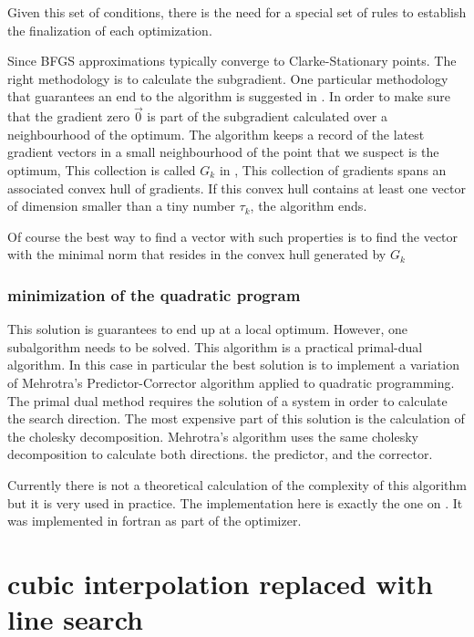 Given this set of conditions, there is the need for a special set of rules to establish the finalization of each optimization.

Since BFGS approximations typically converge to Clarke-Stationary points. The right methodology is to calculate the subgradient. One particular methodology that guarantees an end to the algorithm is suggested in \citep{overtonlewis}.  In order to make sure that the gradient zero $\vec{0}$ is part of the subgradient calculated over a neighbourhood of the optimum.
The algorithm keeps a record of the latest gradient vectors in a small neighbourhood of the point that we suspect is the optimum, This collection is called $G_k$ in \citep{overtonlewis}, This collection of gradients spans an associated convex hull of gradients. If this convex hull contains at least one vector of dimension smaller than a tiny number $\tau_k$, the algorithm ends.

Of course the best way to find a vector with such properties is to find the vector with the minimal norm that resides in the convex hull generated by $G_k$

\subsubsection{minimization of the quadratic program}

This solution is guarantees to end up at a local optimum. However, one subalgorithm needs to be solved. This algorithm is a practical primal-dual algorithm. In this case in particular the best solution is to implement a variation of Mehrotra's Predictor-Corrector algorithm applied to quadratic programming. The primal dual method requires the solution of a system in order to calculate the search direction. The most expensive part of this solution is the calculation of the cholesky decomposition. Mehrotra's algorithm uses the same cholesky decomposition to calculate both directions. the predictor, and the corrector.

Currently there is not a theoretical calculation of the complexity of this algorithm but it is very used in practice. The implementation here is exactly the one on \citep{Nocedal}. It was implemented in fortran as part of the optimizer.

\section{cubic interpolation replaced with line search}

